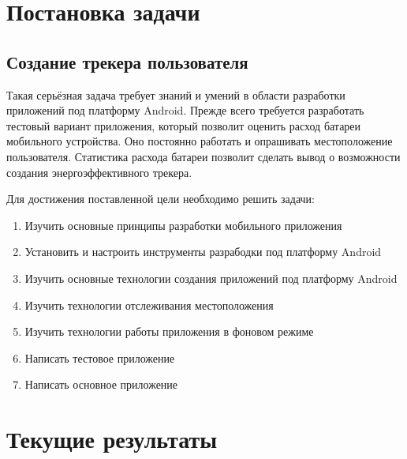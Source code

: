 \documentclass[a4paper,12pt]{article}
\begin{document}
\pagebreak


\section{Постановка задачи}

\subsection{Создание трекера пользователя}

Такая серьёзная задача требует знаний и умений в области
разработки приложений под платформу Android. Прежде всего
требуется разработать тестовый вариант приложения, который
позволит оценить расход батареи мобильного устройства. Оно
постоянно работать и опрашивать местоположение пользователя.
Статистика расхода батареи позволит сделать вывод
о возможности создания энергоэффективного трекера.

Для достижения поставленной цели необходимо решить задачи:

\begin{enumerate}
\item Изучить основные принципы разработки мобильного приложения
\item Установить и настроить инструменты разрабодки под платформу Android
\item Изучить основные технологии создания приложений под платформу Android
\item Изучить технологии отслеживания местоположения
\item Изучить технологии работы приложения в фоновом режиме
\item Написать тестовое приложение
\item Написать основное приложение
\end{enumerate}


\pagebreak


\section{Текущие результаты}
\end{document}
